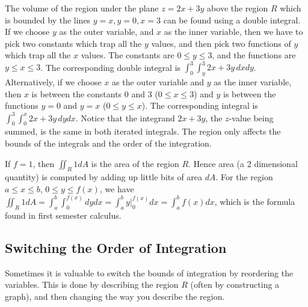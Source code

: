 \begin{example}
%
The volume of the region under the plane $z=2x+3y$ above the region
$R$ which is bounded by the lines $y=x,y=0,x=3$ can be found using a
double integral.  If we choose $y$ as the outer variable, and $x$ as
the inner variable, then we have to pick two constants which trap all
the $y$ values, and then pick two functions of $y$ which trap all the
$x$ values.  The constants are $0\leq y\leq 3$, and the functions are $y\leq x\leq
3$.  The corresponding double integral is $\int_0^3\int_y^3 2x+3y \,dxdy$.
Alternatively, if we choose $x$ as the outer variable and $y$ as the
inner variable, then $x$ is between the constants $0$ and $3$ ($0\leq x\leq
3$) and $y$ is between the functions $y=0$ and $y=x$ ($0\leq y\leq x$).  The
corresponding integral is $\int_0^3\int_0^x 2x+3y \,dydx$. Notice that the
integrand $2x+3y$, the $z$-value being summed, is the same in both
iterated integrals.  The region only affects the bounds of the
integrals and the order of the integration.
\end{example}

If $f=1$, then $\iint_R 1dA$ is the area of the region $R$.  Hence
area (a 2 dimensional quantity) is computed by adding up little bits
of area $dA$.  For the region $a\leq x\leq b$, $0\leq y\leq f(x)$, we have
$\iint_R 1 dA = \int_a^b\int_0^{f(x)}dydx = \int_a^b y\big|_0^{f(x)}dx = \int_a^b
f(x) dx$, which  is the formula found in first semester calculus.


\subsection{Switching the Order of Integration}
Sometimes it is valuable to switch the bounds of integration by
reordering the variables.  This is done by describing the region $R$
(often by constructing a graph), and then changing the way you
describe the region.  

